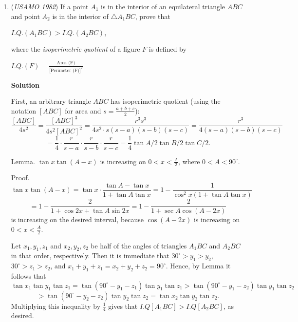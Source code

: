 \begin{enumerate}
 Clearly $(\ref{eq:l2})$ holds for $n\in\{5,3\}$.And one can say that for $n\ge 6$,$\text{RHS of (\ref{eq:l2})}<\text{LHS of (\ref{eq:l2})}$.

 
So our answer is $(m,n)=(5,2),(2,5),(3,2),(2,3)$.

 -ftheftics (edited by integralarefun)

 


	\item (\textit{USAMO 1982}) If a point $A_1$ is in the interior of an equilateral triangle $ABC$ and point $A_2$ is in the interior of $\triangle{A_1BC}$, prove that


 $I.Q. (A_1BC) > I.Q.(A_2BC)$,


 where the \textit{isoperimetric quotient} of a figure $F$ is defined by


 $I.Q.(F) = \frac{\text{Area (F)}}{\text{[Perimeter (F)]}^2}$




\textbf{Solution}

First, an arbitrary triangle $ABC$ has isoperimetric quotient (using the notation $[ABC]$ for area and $s = \frac{a + b + c}{2}$):
 \[\frac{[ABC]}{4s^2} = \frac{[ABC]^3}{4s^2 [ABC]^2} = \frac{r^3 s^3}{4s^2 \cdot s(s-a)(s-b)(s-c)} = \frac{r^3}{4(s-a)(s-b)(s-c)}\]
 \[= \frac{1}{4} \cdot \frac{r}{s-a} \cdot \frac{r}{s-b} \cdot \frac{r}{s-c} = \frac{1}{4} \tan A/2 \tan B/2 \tan C/2.\]

 Lemma. $\tan x \tan (A - x)$ is increasing on $0 < x < \frac{A}{2}$, where $0 < A < 90^\circ$.

 Proof. 
 \[\tan x \tan (A - x) = \tan x \cdot \frac{\tan A - \tan x}{1 + \tan A \tan x} = 1 - \frac{1}{\cos^2 x (1 + \tan A \tan x)}\]
 \[= 1 - \frac{2}{1 + \cos 2x + \tan A \sin 2x} = 1 - \frac{2}{1 + \sec A \cos (A - 2x)}\] is increasing on the desired interval, because $\cos (A - 2x)$ is increasing on $0 < x < \frac{A}{2}.$

 Let $x_1, y_1, z_1$ and $x_2, y_2, z_2$ be half of the angles of triangles $A_1 BC$ and $A_2 BC$ in that order, respectively. Then it is immediate that $30^\circ > y_1 > y_2$, $30^\circ > z_1 > z_2$, and $x_1 + y_1 + z_1 = x_2 + y_2 + z_2 = 90^\circ$. Hence, by Lemma it follows that
 \[\tan x_1 \tan y_1 \tan z_1 = \tan (90^\circ - y_1 - z_1) \tan y_1 \tan z_1 > \tan (90^\circ - y_1 - z_2) \tan y_1 \tan z_2\]
 \[> \tan (90^\circ - y_2 - z_2) \tan y_2 \tan z_2 = \tan x_2 \tan y_2 \tan z_2.\]Multiplying this inequality by $\frac{1}{4}$ gives that $I.Q[A_1 BC] > I.Q[A_2 BC]$, as desired.


\end{enumerate}

